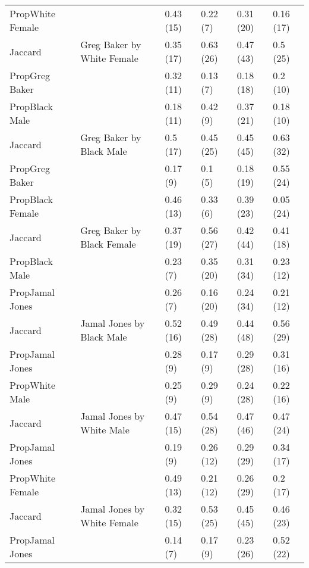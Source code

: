 \begin{tabular}{llllll}
PropWhite Female &  & 0.43 (15) & 0.22 (7) & 0.31 (20) & 0.16 (17)\\

Jaccard & \multirow{-3}{*}{\raggedright\arraybackslash Greg Baker by White Female} & 0.35 (17) & 0.63 (26) & 0.47 (43) & 0.5 (25)\\
\cmidrule{1-6}
PropGreg Baker &  & 0.32 (11) & 0.13 (7) & 0.18 (18) & 0.2 (10)\\

PropBlack Male &  & 0.18 (11) & 0.42 (9) & 0.37 (21) & 0.18 (10)\\

Jaccard & \multirow{-3}{*}{\raggedright\arraybackslash Greg Baker by Black Male} & 0.5 (17) & 0.45 (25) & 0.45 (45) & 0.63 (32)\\
\cmidrule{1-6}
PropGreg Baker &  & 0.17 (9) & 0.1 (5) & 0.18 (19) & 0.55 (24)\\

PropBlack Female &  & 0.46 (13) & 0.33 (6) & 0.39 (23) & 0.05 (24)\\

Jaccard & \multirow{-3}{*}{\raggedright\arraybackslash Greg Baker by Black Female} & 0.37 (19) & 0.56 (27) & 0.42 (44) & 0.41 (18)\\
\cmidrule{1-6}
PropBlack Male &  & 0.23 (7) & 0.35 (20) & 0.31 (34) & 0.23 (12)\\

PropJamal Jones &  & 0.26 (7) & 0.16 (20) & 0.24 (34) & 0.21 (12)\\

Jaccard & \multirow{-3}{*}{\raggedright\arraybackslash Jamal Jones by Black Male} & 0.52 (16) & 0.49 (28) & 0.44 (48) & 0.56 (29)\\
\cmidrule{1-6}
PropJamal Jones &  & 0.28 (9) & 0.17 (9) & 0.29 (28) & 0.31 (16)\\

PropWhite Male &  & 0.25 (9) & 0.29 (9) & 0.24 (28) & 0.22 (16)\\

Jaccard & \multirow{-3}{*}{\raggedright\arraybackslash Jamal Jones by White Male} & 0.47 (15) & 0.54 (28) & 0.47 (46) & 0.47 (24)\\
\cmidrule{1-6}
PropJamal Jones &  & 0.19 (9) & 0.26 (12) & 0.29 (29) & 0.34 (17)\\

PropWhite Female &  & 0.49 (13) & 0.21 (12) & 0.26 (29) & 0.2 (17)\\

Jaccard & \multirow{-3}{*}{\raggedright\arraybackslash Jamal Jones by White Female} & 0.32 (15) & 0.53 (25) & 0.45 (45) & 0.46 (23)\\
\cmidrule{1-6}
PropJamal Jones &  & 0.14 (7) & 0.17 (9) & 0.23 (26) & 0.52 (22)\\


\end{tabular}

